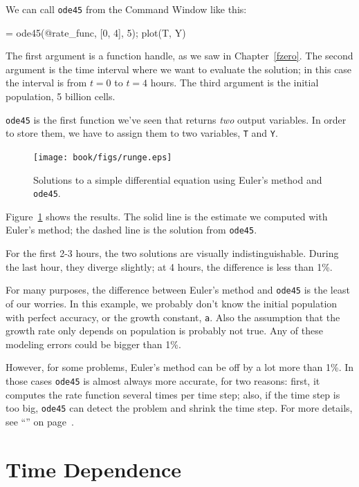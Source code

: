 We can call {\tt ode45} from the Command Window like this:

\begin{code}
[T, Y] = ode45(@rate_func, [0, 4], 5);
plot(T, Y)
\end{code}

The first argument is a function handle, as we saw in Chapter~\ref{fzero}.  The second argument is the time interval where we want to evaluate the solution; in this case the interval is from $t=0$ to $t=4$ hours.  The third argument is the initial population, 5 billion cells.


{\tt ode45} is the first function we've seen that returns {\em two} output variables.  In order to store them, we have to assign them to two variables, {\tt T} and {\tt Y}.

\begin{figure}[ht]
\centerline{\texttt{[image: book/figs/runge.eps]}}
\caption{Solutions to a simple differential equation using Euler's method and {\tt ode45}.}
\label{fig:runge}
\end{figure}

Figure~\ref{fig:runge} shows the results.  The solid line is the estimate we computed with Euler's method; the dashed line is the solution from {\tt ode45}.

For the first 2-3 hours, the two solutions are visually indistinguishable.  During the last hour, they diverge slightly; at 4 hours, the difference is less than 1\%.

For many purposes, the difference between Euler's method and {\tt ode45} is the least of our worries.  In this example, we probably don't know the initial population with perfect accuracy, or the growth constant, {\tt a}.  Also the assumption that the growth rate only depends on population is probably not true.  Any of these modeling errors could be bigger than 1\%.

However, for some problems, Euler's method can be off by a lot more than 1\%.  In those cases {\tt ode45} is almost always more accurate, for two reasons: first, it computes the rate function several times per time step; also, if the time step is too big, {\tt ode45} can detect the problem and shrink the time step.  For more details, see ``'' on page~\pageref{howode45}.


\section{Time Dependence}

